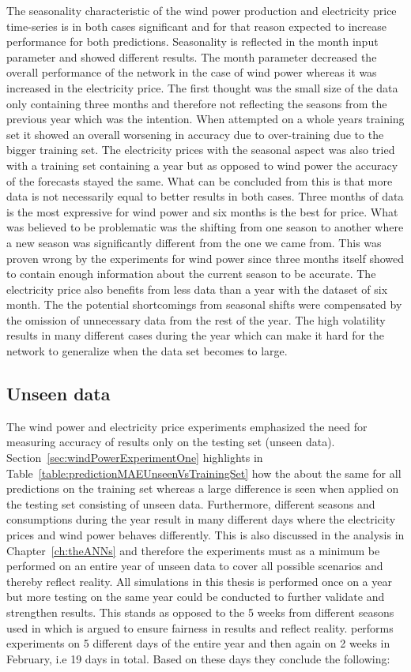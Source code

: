 The seasonality characteristic of the wind power production and electricity price time-series is in both cases significant and for that reason expected to increase performance for both predictions. Seasonality is reflected in the month input parameter and showed different results. The month parameter decreased the overall performance of the network in the case of wind power whereas it was increased in the electricity price. The first thought was the small size of the data only containing three months and therefore not reflecting the seasons from the previous year which was the intention. When attempted on a whole years training set it showed an overall worsening in accuracy due to over-training due to the bigger training set. The electricity prices with the seasonal aspect was also tried with a training set containing a year but as opposed to wind power the accuracy of the forecasts stayed the same. What can be concluded from this is that more data is not necessarily equal to better results in both cases. Three months of data is the most expressive for wind power and six months is the best for price. What was believed to be problematic was the shifting from one season to another where a new season was significantly different from the one we came from. This was proven wrong by the experiments for wind power since three months itself showed to contain enough information about the current season to be accurate. The electricity price also benefits from less data than a year with the dataset of six month. The the potential shortcomings from seasonal shifts were compensated by the omission of unnecessary data from the rest of the year. The high volatility results in many different cases during the year which can make it hard for the network to generalize when the data set becomes to large.

\subsection{Unseen data}
\label{sec:unseenDataDiscussion}
The wind power and electricity price experiments emphasized the need for measuring accuracy of results only on the testing set (unseen data). Section~\ref{sec:windPowerExperimentOne} highlights in Table~\ref{table:predictionMAEUnseenVsTrainingSet} how the about the same for all predictions on the training set whereas a large difference is seen when applied on the testing set consisting of unseen data. Furthermore, different seasons and consumptions during the year result in many different days where the electricity prices and wind power behaves differently. This is also discussed in the analysis in Chapter~\ref{ch:theANNs} and therefore the experiments must as a minimum be performed on an entire year of unseen data to cover all possible scenarios and thereby reflect reality. All simulations in this thesis is performed once on a year but more testing on the same year could be conducted to further validate and strengthen results. This stands as opposed to the 5 weeks from different seasons used in \cite{1} which is argued to ensure fairness in results and reflect reality. \cite{pjmForecast} performs experiments on 5 different days of the entire year and then again on 2 weeks in February, i.e 19 days in total. Based on these days they conclude the following:

